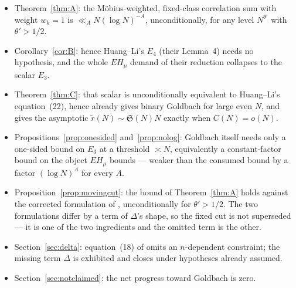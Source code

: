 \documentclass[11pt,a4paper]{article}
\theoremstyle{plain}
\theoremstyle{definition}
\theoremstyle{remark}
\renewcommand{\SS}{\mathfrak{S}}
\begin{document}
\begin{itemize}
\item Theorem~\ref{thm:A}: the M\"obius-weighted, fixed-class
correlation sum with weight $w_k=1$ is $\ll_A N(\log N)^{-A}$,
unconditionally, for any level $N^{\theta'}$ with $\theta'>1/2$.

\item Corollary~\ref{cor:B}: hence Huang--Li's $E_4$ (their Lemma~4)
needs no hypothesis, and the whole $EH_\mu$ demand of their reduction
collapses to the scalar $E_3$.

\item Theorem~\ref{thm:C}: that scalar is unconditionally equivalent
to Huang--Li's equation~(22), hence already gives binary Goldbach for
large even $N$, and gives the asymptotic $\tilde r(N)\sim\SS(N)N$
exactly when $C(N)=o(N)$.

\item Propositions~\ref{prop:onesided} and~\ref{prop:nolog}: Goldbach
itself needs only a one-sided bound on $E_3$ at a threshold
$\asymp N$, equivalently a constant-factor bound on the object
$EH_\mu$ bounds --- weaker than the consumed bound by a factor
$(\log N)^A$ for every $A$.

\item Proposition~\ref{prop:movingcut}: the bound of
Theorem~\ref{thm:A} holds against the corrected formulation of
\cite{HL}, unconditionally for $\theta'>1/2$. The two formulations
differ by a term of $\Delta$'s shape, so the fixed cut is not
superseded --- it is one of the two ingredients and the omitted term is
the other.

\item Section~\ref{sec:delta}: equation~(18) of \cite{HL} omits an
$n$-dependent constraint; the missing term $\Delta$ is exhibited and
closes under hypotheses already assumed.

\item Section~\ref{sec:notclaimed}: the net progress toward Goldbach
is zero.
\end{itemize}
\end{document}
